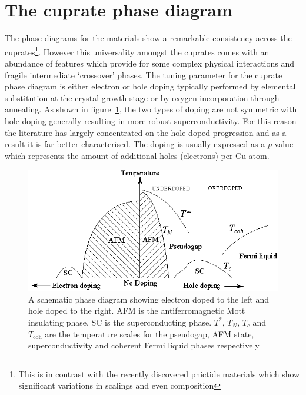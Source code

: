 \section{The cuprate phase diagram}

The phase diagrams for the \highTc materials show a remarkable consistency across the cuprates\footnote{This is in contrast with the recently discovered pnictide materials which show significant variations in scalings and even composition}. However this universality amongst the cuprates comes with an abundance of features which provide for some complex physical interactions and fragile intermediate `crossover' phases. The tuning parameter for the cuprate phase diagram is either electron or hole doping typically performed by elemental substitution at the crystal growth stage or by oxygen incorporation through annealing. As shown in figure~\ref{Fig:Intro:ElecHolePhaseDiagram}, the two types of doping are not symmetric with hole doping generally resulting in more robust superconductivity. For this reason the literature has largely concentrated on the hole doped progression and as a result it is far better characterised. The doping is usually expressed as a $p$ value which represents the amount of additional holes (electrons) per Cu atom.
\begin{figure}[htbp]
    \begin{center}
        \includegraphics[scale=0.9]{Chapter-Introduction/Figures/ElecHolePhaseDiagram/ElecHolePhaseDiagram}
        \caption{A schematic phase diagram showing electron doped to the left and hole doped to the right. \ac{AFM} is the antiferromagnetic Mott insulating phase, SC is the superconducting phase. $T^*$, $T_N$, $T_c$ and $T_{\textrm{coh}}$ are the temperature scales for the pseudogap, \ac{AFM} state, superconductivity and coherent Fermi liquid phases respectively}
        \label{Fig:Intro:ElecHolePhaseDiagram}
    \end{center}
\end{figure}

